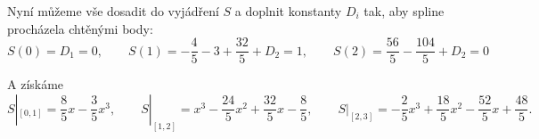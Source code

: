 \documentclass[12pt]{article}                   %
\begin{document}
\begin{priklad}[5.1]
\begin{reseni}[Odvození]
		Nyní můžeme vše dosadit do vyjádření $S$ a doplnit konstanty $D_i$ tak, aby spline procházela chtěnými body:
		$$ S(0) = D_1 = 0, \qquad S(1) = -\frac{4}{5} - 3 + \frac{32}{5} + D_2 = 1, \qquad S(2) = \frac{56}{5} - \frac{104}{5} + D_2 = 0 $$
		
		A získáme
		$$ S|_{[0, 1]} = \frac{8}{5}x - \frac{3}{5}x^3, \qquad S|_{[1, 2]} = x^3 - \frac{24}{5}x^2 + \frac{32}{5}x - \frac{8}{5}, \qquad S|_{[2, 3]} = -\frac{2}{5}x^3 + \frac{18}{5}x^2 - \frac{52}{5}x + \frac{48}{5}. $$
	\end{reseni}
\end{priklad}
\end{document}
